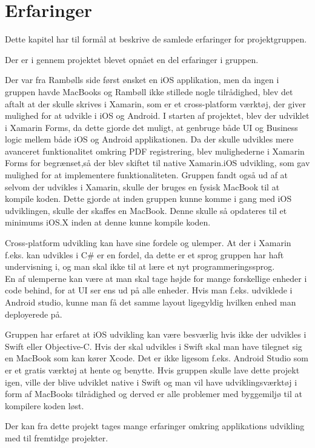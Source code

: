 \chapter{Erfaringer}
Dette kapitel har til formål at beskrive de samlede erfaringer for projektgruppen. 

Der er i gennem projektet blevet opnået en del erfaringer i gruppen.

Der var fra Rambølls side først ønsket en iOS applikation, men da ingen i gruppen havde MacBooks og Rambøll ikke stillede nogle tilrådighed, blev det aftalt at der skulle skrives i Xamarin, som er et cross-platform værktøj, der giver mulighed for at udvikle i iOS og Android.
I starten af projektet, blev der udviklet i Xamarin Forms, da dette gjorde det muligt, at genbruge både UI og Business logic mellem både iOS og Android applikationen. Da der skulle udvikles mere avanceret funktionalitet omkring PDF registrering, blev mulighederne i Xamarin Forms for begrænset\cite{Forms},så der blev skiftet til native Xamarin.iOS udvikling, som gav mulighed for at implementere funktionaliteten.
Gruppen fandt også ud af at selvom der udvikles i Xamarin, skulle der bruges en fysisk MacBook til at kompile koden. Dette gjorde at inden gruppen kunne komme i gang med iOS udviklingen, skulle der skaffes en MacBook. Denne skulle så opdateres til et minimums iOS.X inden at denne kunne kompile koden.

Cross-platform udvikling kan have sine fordele og ulemper. At der i Xamarin f.eks. kan udvikles i C\# er en fordel, da dette er et sprog gruppen har haft undervisning i, og man skal ikke til at lære et nyt programmeringssprog. \\
En af ulemperne kan være at man skal tage højde for mange forskellige enheder i code behind, for at UI ser ens ud på alle enheder. Hvis man f.eks. udviklede i Android studio, kunne man få det samme layout ligegyldig hvilken enhed man deployerede på.

Gruppen har erfaret at iOS udvikling kan være besværlig hvis ikke der udvikles i Swift\cite{Swift} eller Objective-C\cite{ObjC}. Hvis der skal udvikles i Swift skal man have tilegnet sig en MacBook som kan kører Xcode\cite{Xcode}. Det er ikke ligesom f.eks. Android Studio som er et gratis værktøj at hente og benytte.
Hvis gruppen skulle lave dette projekt igen, ville der blive udviklet native i Swift og man vil have udviklingsværktøj i form af MacBooks tilrådighed og derved er alle problemer med byggemiljø til at kompilere koden løst.

Der kan fra dette projekt tages mange erfaringer omkring applikations udvikling med til fremtidge projekter. \\


